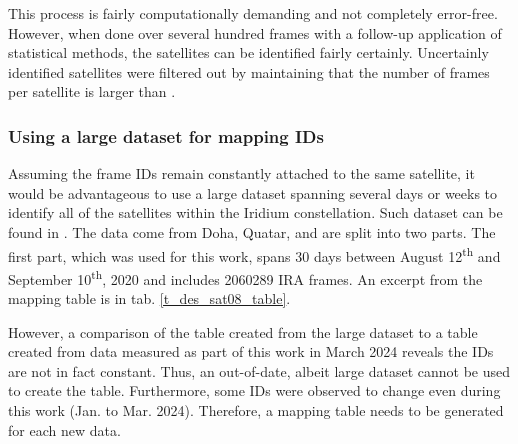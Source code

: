This process is fairly computationally demanding and not completely error-free. However, when done over several hundred frames with a follow-up application of statistical methods, the satellites can be identified fairly certainly. Uncertainly identified satellites were filtered out by maintaining that the number of frames per satellite is larger than .

\subsubsection{Using a large dataset for mapping IDs}
Assuming the frame IDs remain constantly attached to the same satellite, it would be advantageous to use a large dataset spanning several days or weeks to identify all of the satellites within the Iridium constellation. Such dataset can be found in \cite{sat08}. The data come from Doha, Quatar, and are split into two parts. The first part, which was used for this work, spans 30 days between August 12\textsuperscript{th} and September 10\textsuperscript{th}, 2020 and includes \num{2060289} IRA frames. An excerpt from the mapping table is in tab. \ref{t_des_sat08_table}.

However, a comparison of the table created from the large dataset to a table created from data measured as part of this work in March 2024 reveals the IDs are not in fact constant. Thus, an out-of-date, albeit large dataset cannot be used to create the table. Furthermore, some IDs were observed to change even during this work (Jan. to Mar. 2024). Therefore, a mapping table needs to be generated for each new data.

